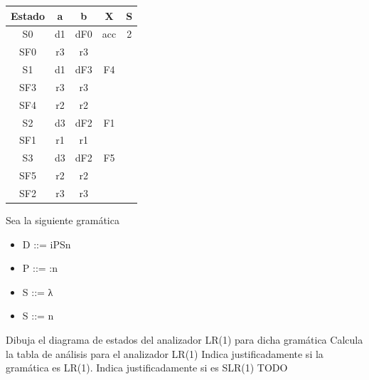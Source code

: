 \documentclass[nochap]{apuntes}
\begin{document}
\begin{problem}
\ppart
\begin{tabular}{| c | c | c | c | c | }
\hline
Estado  & a & b & X & S \\
\hline
S0 & d1 & dF0 & acc & 2\\
\hline
SF0 & r3  & r3 &  & \\
\hline
S1 & d1 & dF3 & F4 &  \\
\hline
SF3 & r3 & r3 &  & \\
\hline
SF4 & r2 & r2 &  &   \\
\hline
S2 & d3 & dF2 & F1 &  \\
\hline
SF1 & r1 & r1 &  &  \\
\hline
S3 & d3 & dF2 & F5 & \\
\hline
SF5 & r2 & r2 &  &  \\
\hline
SF2 & r3 & r3 &  &  \\
\hline
\end{tabular}


\end{problem}

\begin{problem}
Sea la siguiente gramática

\begin{itemize}
\item D ::= iPSn
\item P ::= :n
\item S ::= λ
\item S ::= n
\end{itemize}

\ppart Dibuja el diagrama de estados del analizador LR(1) para dicha gramática
\ppart Calcula la tabla de análisis para el analizador LR(1)
\ppart Indica justificadamente si la gramática es LR(1). Indica justificadamente si es SLR(1)
\solution
TODO
\end{problem}
\end{document}
